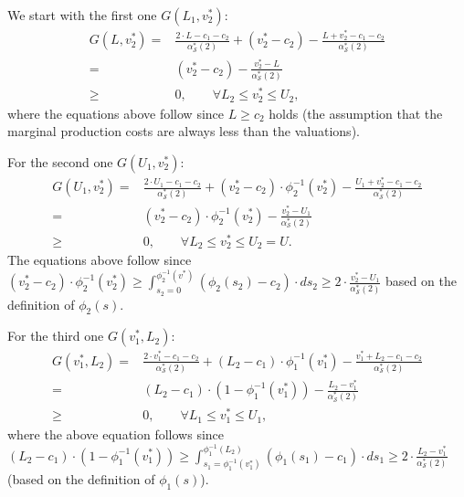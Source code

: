         We start with the first one $G(L_1,v^{*}_{2})$:
        \begin{align*}
            G(L,v^{*}_{2})
            = & \frac{2\cdot L - c_1-c_2}{\alpha_{\mathcal{S}}^*(2)} + (v^{*}_{2}-c_2) - \frac{L+v^{*}_{2}-c_1-c_2}{\alpha_{\mathcal{S}}^*(2)}\\
            = & (v^{*}_{2}-c_2) - \frac{v^{*}_{2} - L}{\alpha_{\mathcal{S}}^*(2)} \\
            \ge & 0, \qquad  \forall L_{2} \leq v^{*}_{2} \leq U_{2},
           \end{align*}
           where the equations above follow  since $L \ge c_{2}$ holds (the assumption that the marginal production costs are always less than the valuations).

           For the second one $ G(U_{1},v^{*}_{2}) $:
           \begin{align*}
            G(U_{1},v^{*}_{2})
            = & \frac{2\cdot U_{1} - c_1-c_2}{\alpha_{\mathcal{S}}^*(2)} +(v^{*}_{2}-c_2)\cdot \phi_{2}^{-1}(v^{*}_{2})- \frac{U_1+v^{*}_{2}-c_1-c_2}{\alpha_{\mathcal{S}}^*(2)} \\
            = & (v^{*}_{2}-c_2)\cdot \phi_{2}^{-1}(v^{*}_{2}) - \frac{v^{*}_{2}-U_1}{\alpha_{\mathcal{S}}^*(2)} \\
            \ge & 0, \qquad   \forall L_2 \leq v^{*}_{2} \leq U_2=U.
            \end{align*}
            The equations above follow since $(v^{*}_{2}-c_2)\cdot \phi_{2}^{-1}(v^{*}_{2}) \ge \int_{s_2=0}^{\phi^{-1}_{2}(v^{*})} (\phi_{2}(s_2)-c_{2})\cdot ds_{2} \ge 2 \cdot \frac{v^{*}_{2}-U_1}{\alpha_{\mathcal{S}}^*(2)}$ based on the definition of $\phi_{2}(s)$. 

            For the third one $ G(v^{*}_{1},L_2) $:
            \begin{align*}
            G(v^{*}_{1},L_2)
            = & \frac{2\cdot v^{*}_{1} - c_1-c_2}{\alpha_{\mathcal{S}}^*(2)} + (L_2-c_1)\cdot\phi_{1}^{-1}(v^{*}_{1}) - \frac{v^{*}_{1}+L_2-c_1-c_2}{\alpha_{\mathcal{S}}^*(2)} \\
             = & (L_2-c_1)\cdot (1-\phi_{1}^{-1}(v^{*}_{1})) - \frac{L_2-v^{*}_{1}}{\alpha_{\mathcal{S}}^*(2)} \\
             \ge & 0, \qquad \forall  L_1\leq v^{*}_{1} \leq U_1,
             \end{align*}
         where the above equation follows since $(L_2-c_1)\cdot (1-\phi_{1}^{-1}(v^{*}_{1})) \ge \int_{s_1=\phi_{1}^{-1}(v^{*}_{1})}^{\phi^{-1}_{1}(L_{2})} (\phi_{1}(s_1)-c_{1})\cdot ds_{1} \ge 2 \cdot \frac{L_{2}-v^{*}_{1}}{\alpha_{\mathcal{S}}^*(2)}$ (based on the definition of $\phi_{1}(s)$).

